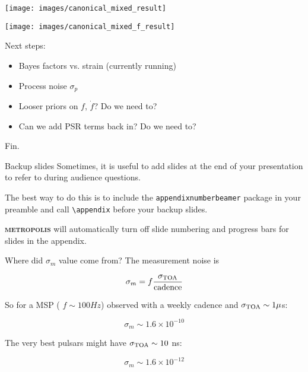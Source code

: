 \documentclass[10pt]{beamer}
\newcommand{\themename}{\textbf{\textsc{metropolis}}\xspace}
\begin{document}
\begin{frame}
		\texttt{[image: images/canonical\_mixed\_result]}
\end{frame}



\begin{frame}
	\texttt{[image: images/canonical\_mixed\_f\_result]}
\end{frame}



\begin{frame}
	Next steps:
	\begin{itemize}
		\item Bayes factors vs. strain (currently running)
		\item Process noise $\sigma_p$
		\item Looser priors on $f$, $\dot{f}$? Do we need to?
		\item Can we add PSR terms back in? Do we need to?
	\end{itemize}
\end{frame}


\begin{frame}[standout]
	Fin.
\end{frame}

\appendix

\begin{frame}[fragile]{Backup slides}
	Sometimes, it is useful to add slides at the end of your presentation to
	refer to during audience questions.
	
	The best way to do this is to include the \verb|appendixnumberbeamer|
	package in your preamble and call \verb|\appendix| before your backup slides.
	
	\themename will automatically turn off slide numbering and progress bars for
	slides in the appendix.
\end{frame}


\begin{frame}[fragile]{Where did $\sigma_m$ value come from?}
The measurement noise is

$$ \sigma_m = f \frac{\sigma_{\rm TOA}}{\rm cadence}$$

So for a MSP ( $f \sim 100 Hz$) observed with a weekly cadence and $\sigma_{\rm TOA} \sim 1 \mu$s:


$$\sigma_m \sim 1.6 \times 10^{-10}$$

The very best pulsars might have $\sigma_{\rm TOA} \sim 10$ ns:

$$\sigma_m \sim 1.6 \times 10^{-12}$$
\end{frame}
\end{document}
